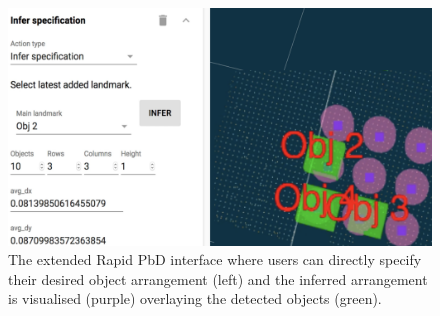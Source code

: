 
\begin{figure}
	\begin{center}
		\includegraphics[width=0.8\linewidth]{figures/gui-iros}
		\caption{The extended Rapid PbD interface where users can directly specify their desired object arrangement (left) and the inferred arrangement is visualised (purple) overlaying the detected objects (green).}
		\label{fig:gui}
	\end{center}
\end{figure}



